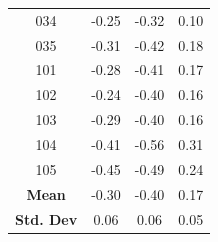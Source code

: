 \documentclass[12pt]{article}
\begin{document}
\begin{table}[p!]
\begin{tabular}{c | c c c}
		034 &  -0.25 &    -0.32 &       0.10 \\
		035 &  -0.31 &    -0.42 &       0.18 \\
		101 &  -0.28 &    -0.41 &       0.17 \\
		102 &  -0.24 &    -0.40 &       0.16 \\
		103 &  -0.29 &    -0.40 &       0.16 \\
		104 &  -0.41 &    -0.56 &       0.31 \\
		105 &  -0.45 &    -0.49 &       0.24 \\
		\bottomrule
		\textbf{Mean} & -0.30 & -0.40 & 0.17 \\
		\textbf{Std. Dev} & 0.06 & 0.06 & 0.05 \\
	\end{tabular}
	\label{tab:3}
\end{table}
\end{document}
